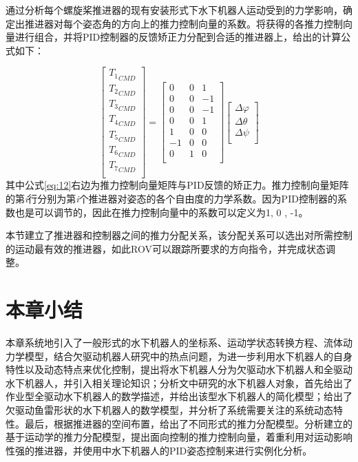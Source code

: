 通过分析每个螺旋桨推进器的现有安装形式下水下机器人运动受到的力学影响，确定出推进器对每个姿态角的方向上的推力控制向量的系数。将获得的各推力控制向量进行组合，并将PID控制器的反馈矫正力分配到合适的推进器上，给出的计算公式如下：

\begin{equation}
\label{eq:12}
\left[ {\begin{array}{*{20}{c}}
   {{T_1}_{CMD}}  \\
   {{T_2}_{CMD}}  \\
   {{T_3}_{CMD}}  \\
   {{T_4}_{CMD}}  \\
   {{T_5}_{CMD}}  \\
   {{T_6}_{CMD}}  \\
   {{T_7}_{CMD}}  \\
\end{array}} \right] = \left[ {\begin{array}{*{20}{c}}
   0 & 0 & 1  \\
   0 & 0 & { - 1}  \\
   0 & 0 & { - 1}  \\
   0 & 0 & 1  \\
   1 & 0 & 0  \\
   { - 1} & 0 & 0  \\
   0 & 1 & 0  \\
\end{array}} \right]\left[ {\begin{array}{*{20}{c}}
   {\Delta \varphi }  \\
   {\Delta \theta }  \\
   {\Delta \psi }  \\
\end{array}} \right]
\end{equation}
其中公式\ref{eq:12}右边为推力控制向量矩阵与PID反馈的矫正力。推力控制向量矩阵的第\textit{i}行分别为第\textit{i}个推进器对姿态的各个自由度的力学系数。因为PID控制器的系数也是可以调节的，因此在推力控制向量中的系数可以定义为1, 0 , -1。

本节建立了推进器和控制器之间的推力分配关系，该分配关系可以选出对所需控制的运动最有效的推进器，如此ROV可以跟踪所要求的方向指令，并完成状态调整。

\section{本章小结 }

本章系统地引入了一般形式的水下机器人的坐标系、运动学状态转换方程、流体动力学模型，结合欠驱动机器人研究中的热点问题，为进一步利用水下机器人的自身特性以及动态特点来优化控制，提出将水下机器人分为欠驱动水下机器人和全驱动水下机器人，并引入相关理论知识；分析文中研究的水下机器人对象，首先给出了作业型全驱动水下机器人的数学描述，并给出该型水下机器人的简化模型；给出了欠驱动鱼雷形状的水下机器人的数学模型，并分析了系统需要关注的系统动态特性。最后，根据推进器的空间布置，给出了不同形式的推力分配模型。分析建立的基于运动学的推力分配模型，提出面向控制的推力控制向量，着重利用对运动影响性强的推进器，并使用中水下机器人的PID姿态控制来进行实例化分析。
